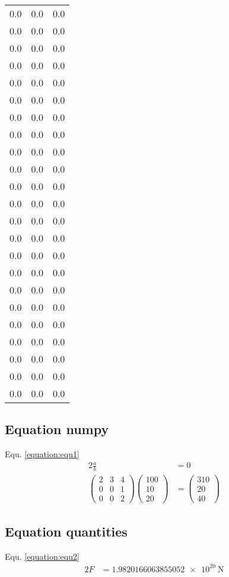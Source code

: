 \documentclass{article}%
\begin{document}
\begin{longtable}{|l|l|l|}
0.0&0.0&0.0\\%
0.0&0.0&0.0\\%
0.0&0.0&0.0\\%
0.0&0.0&0.0\\%
0.0&0.0&0.0\\%
0.0&0.0&0.0\\%
0.0&0.0&0.0\\%
0.0&0.0&0.0\\%
0.0&0.0&0.0\\%
0.0&0.0&0.0\\%
0.0&0.0&0.0\\%
0.0&0.0&0.0\\%
0.0&0.0&0.0\\%
0.0&0.0&0.0\\%
0.0&0.0&0.0\\%
0.0&0.0&0.0\\%
0.0&0.0&0.0\\%
0.0&0.0&0.0\\%
0.0&0.0&0.0\\%
0.0&0.0&0.0\\%
0.0&0.0&0.0\\%
0.0&0.0&0.0\\%
0.0&0.0&0.0\\%
\end{longtable}

%
\subsection{Equation numpy}%
\label{subsec:Equationnumpy}%
Equ. \ref{equation:equ1}%
\begin{alignat}{2}%
\frac{a}{b} &= 0 \\%
\begin{pmatrix}%
2&3&4\\%
0&0&1\\%
0&0&2%
\end{pmatrix}%
\begin{pmatrix}%
100\\%
10\\%
20%
\end{pmatrix}%
&=%
\begin{pmatrix}%
310\\%
20\\%
40%
\end{pmatrix}%
\label{equation:equ1}%
\end{alignat}

%
\subsection{Equation quantities}%
\label{subsec:Equationquantities}%
Equ. \ref{equation:equ2}%
\begin{alignat}{2}%
F%
&=%
\SI[round-precision=4,round-mode=figures]{1.9820166063855052e+20}{\newton}%
\label{equation:equ2}%
\end{alignat}
\end{document}
